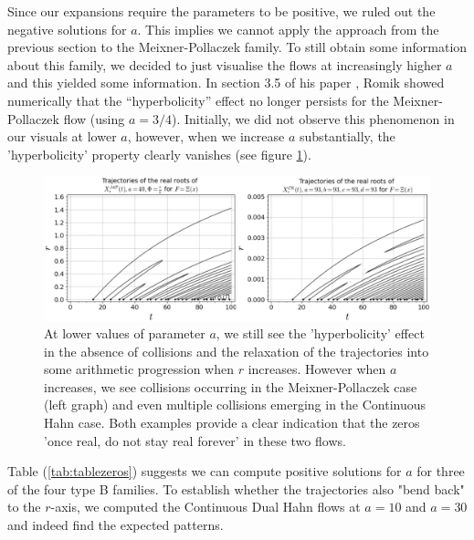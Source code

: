\documentclass[a4paper,11pt,twoside]{amsart}
\begin{document}
Since our expansions require the parameters to be positive, we ruled out the negative solutions for $a$. This implies we cannot apply the approach from the previous section to the Meixner-Pollaczek family. To still obtain some information about this family, we decided to just visualise the flows at increasingly higher $a$ and this yielded some information. In section 3.5 of his paper \cite{rom}, Romik showed numerically that the “hyperbolicity” effect no longer persists for the Meixner-Pollaczek flow (using $a =3/4$). Initially, we did not observe this phenomenon in our visuals at lower $a$, however, when we increase $a$ substantially, the 'hyperbolicity' property clearly vanishes (see figure \ref{fig:MeixHyperbFail}).  

\begin{figure}[H]
  \includegraphics[width=1\linewidth]{MeixPollContHahnbreak.jpg}
  \caption{At lower values of parameter $a$, we still see the 'hyperbolicity' effect in the absence of collisions and the relaxation of the trajectories into some arithmetic progression when $r$ increases. However when $a$ increases, we see collisions occurring in the Meixner-Pollaczek case (left graph) and even multiple collisions emerging in the Continuous Hahn case. Both examples provide a clear indication that the zeros 'once real, do not stay real forever' in these two flows.}
  \label{fig:MeixHyperbFail}
\end{figure}

Table (\ref{tab:tablezeros}) suggests we can compute positive solutions for $a$ for three of the four type B families. To establish whether the trajectories also "bend back" to the $r$-axis, we computed the Continuous Dual Hahn flows at $a=10$ and $a=30$ and indeed find the expected patterns.
\end{document}
